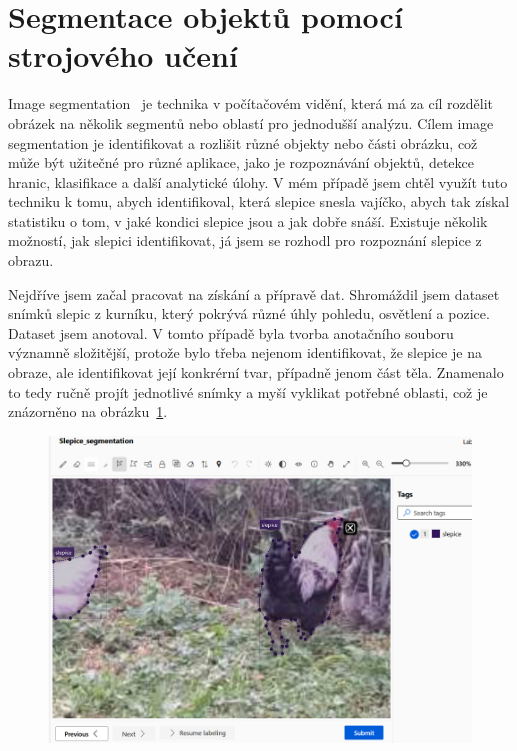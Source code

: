 \section{Segmentace objektů pomocí strojového učení}\label{sec:klasifikace-a-segmentace-objektu-pomoci-strojoveho-uceni}

Image segmentation~\cite{segmentace} je technika v počítačovém vidění, která má za cíl rozdělit obrázek na několik segmentů nebo oblastí pro jednodušší analýzu.
Cílem image segmentation je identifikovat a rozlišit různé objekty nebo části obrázku, což může být užitečné pro různé aplikace, jako je rozpoznávání objektů, detekce hranic, klasifikace a další analytické úlohy.
V mém případě jsem chtěl využít tuto techniku k tomu, abych identifikoval, která slepice snesla vajíčko, abych tak získal statistiku o tom, v jaké kondici slepice jsou a jak dobře snáší.
Existuje několik možností, jak slepici identifikovat, já jsem se rozhodl pro rozpoznání slepice z obrazu.

Nejdříve jsem začal pracovat na získání a přípravě dat.
Shromáždil jsem dataset snímků slepic z kurníku, který pokrývá různé úhly pohledu, osvětlení a pozice.
Dataset jsem anotoval.
V tomto případě byla tvorba anotačního souboru významně složitější, protože bylo třeba nejenom identifikovat, že slepice je na obraze, ale identifikovat její konkrérní tvar, případně jenom část těla.
Znamenalo to tedy ručně projít jednotlivé snímky a myší vyklikat potřebné oblasti, což je znázorněno na obrázku~\ref{fig:label_segmentation}.
\begin{figure}[H]
    \centering
    \includegraphics[width=1.0\textwidth]{img/label_segmentation}
    \label{fig:label_segmentation}
\end{figure}

